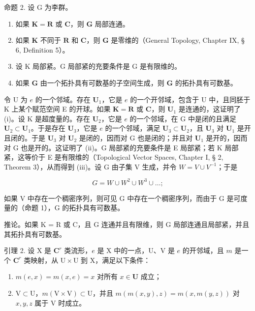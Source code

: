 命题 2. 设 G 为李群。

\begin{enumerate}
\def\labelenumi{(\roman{enumi})}
\item
  如果 \(\mathbf{K} = \mathbf{R}\) 或 \(\mathbf{C}\)，则 \(\mathbf{G}\) 局部连通。
\item
  如果 \(\mathbf{K}\) 不同于 \(\mathbf{R}\) 和 \(\mathbf{C}\)，则 \(\mathbf{G}\) 是零维的（General Topology, Chapter IX, § 6, Definition 5）。
\item
  设 K 局部紧。G 局部紧的充要条件是 G 是有限维的。
\item
  如果 \(\mathbf{G}\) 由一个拓扑具有可数基的子空间生成，则 \(\mathbf{G}\) 的拓扑具有可数基。
\end{enumerate}

令 U 为 \(e\) 的一个邻域。存在 \(\mathbf{U}_1\)，它是 \(e\) 的一个开邻域，包含于 U 中，且同胚于 K 上某个赋范空间 E 的开球。如果 \(\mathbf{K} = \mathbf{R}\) 或 \(\mathbf{C}\)，则 \(\mathbf{U}_1\) 是连通的，这证明了 (i)。设 K 是超度量的。存在 \(\mathbf{U}_2\)，它是 \(e\) 的一个邻域，在 G 中是闭的且满足 \(\mathbf{U}_2 \subset \mathbf{U}_1\)。于是存在 \(\mathbf{U}_3\)，它是 \(e\) 的一个邻域，满足 \(\mathbf{U}_3 \subset \mathbf{U}_2\)，且 \(\mathbf{U}_3\) 对 \(\mathbf{U}_1\) 是开且闭的。于是 \(\mathbf{U}_3\) 对 \(\mathbf{U}_2\) 是闭的，因而对 G 也是闭的；并且对 \(\mathbf{U}_1\) 是开的，因而对 G 也是开的。这证明了 (ii)。G 局部紧的充要条件是 E 局部紧；若 K 局部紧，这等价于 E 是有限维的（Topological Vector Spaces, Chapter I, § 2, Theorem 3），从而得到 (iii)。设 G 由子集 V 生成，并令 \(W = V \cup V^{-1}\)；于是

\[
G = W \cup W ^ {2} \cup W ^ {3} \cup \dots ;
\]

如果 V 中存在一个稠密序列，则可见 G 中存在一个稠密序列，而由于 G 是可度量的（命题 1），G 的拓扑具有可数基。

推论。如果 K = R 或 C，且 G 连通并且有限维，则 G 局部连通且局部紧，并且其拓扑具有可数基。

引理 2. 设 X 是 \(\mathbf{C}^r\) 类流形，\(e\) 是 X 中的一点，U、V 是 \(e\) 的开邻域，且 \(m\) 是一个 \(\mathbf{C}^r\) 类映射，从 \(\mathrm{U} \times \mathrm{U}\) 到 X，满足以下条件：

\begin{enumerate}
\def\labelenumi{(\alph{enumi})}
\item
  \(m(e,x) = m(x,e) = x\) 对所有 \(x\in \mathbf{U}\) 成立；
\item
  \(\mathrm{V} \subset \mathrm{U}\)，\(m(\mathrm{V} \times \mathrm{V}) \subset \mathrm{U}\)，并且 \(m(m(x, y), z) = m(x, m(y, z))\) 对 \(x, y, z\) 属于 \(\mathrm{V}\) 时成立。
\end{enumerate}

